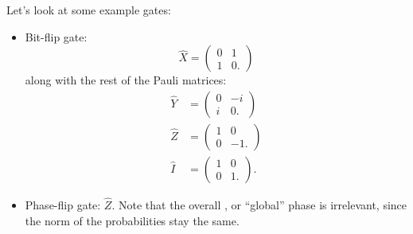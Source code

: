 \documentclass{article}
\numberwithin{equation}{section}
\begin{document}
Let's look at some example gates:
\begin{itemize}
    \item Bit-flip gate:
    \begin{equation}
        \hat{X} = \begin{pmatrix}
            0 & 1 \\ 
            1 & 0.
        \end{pmatrix}
    \end{equation}
    along with the rest of the Pauli matrices:
    \begin{align}
        \hat{Y} &= \begin{pmatrix}
            0 & -i \\ 
            i & 0.
        \end{pmatrix} \\ 
        \hat{Z} &= \begin{pmatrix}
            1 & 0 \\ 
            0 & -1.
        \end{pmatrix} \\
        \hat{I} &= \begin{pmatrix}
            1 & 0 \\ 
            0 & 1.
        \end{pmatrix}.
    \end{align}
    \item Phase-flip gate: $\hat{Z}.$ Note that the overall , or ``global'' phase is irrelevant, since the norm of the probabilities stay the same.
\end{itemize}
\end{document}
